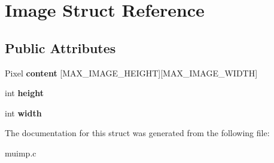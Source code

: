 \hypertarget{structImage}{\section{Image Struct Reference}
\label{structImage}
}
\subsection*{Public Attributes}
\begin{DoxyCompactItemize}
\item 
\hypertarget{structImage_ac6e2af5174621c13fae979abb25ff01c}{Pixel {\bfseries content} \mbox{[}M\-A\-X\-\_\-\-I\-M\-A\-G\-E\-\_\-\-H\-E\-I\-G\-H\-T\mbox{]}\mbox{[}M\-A\-X\-\_\-\-I\-M\-A\-G\-E\-\_\-\-W\-I\-D\-T\-H\mbox{]}}\label{structImage_ac6e2af5174621c13fae979abb25ff01c}

\item 
\hypertarget{structImage_a51df43db420c9c0b57536cb2dd36de5c}{int {\bfseries height}}\label{structImage_a51df43db420c9c0b57536cb2dd36de5c}

\item 
\hypertarget{structImage_ab8d12f635013c04159cd4d3d972bac88}{int {\bfseries width}}\label{structImage_ab8d12f635013c04159cd4d3d972bac88}

\end{DoxyCompactItemize}


The documentation for this struct was generated from the following file\-:\begin{DoxyCompactItemize}
\item 
muimp.\-c\end{DoxyCompactItemize}
